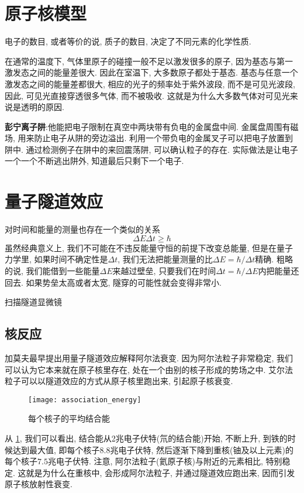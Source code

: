 \documentclass[openany]{book}
\begin{document}
\section{原子核模型}
电子的数目, 或者等价的说, 质子的数目, 决定了不同元素的化学性质.\par
在通常的温度下, 气体里原子的碰撞一般不足以激发很多的原子, 因为基态与第一激发态之间的能量差很大. 因此在室温下, 大多数原子都处于基态. 基态与任意一个激发态之间的能量差都很大, 相应的光子的频率处于紫外波段, 而不是可见光波段, 因此, 可见光直接穿透很多气体, 而不被吸收. 这就是为什么大多数气体对可见光来说是透明的原因.\par
\textbf{彭宁离子阱}:他能把电子限制在真空中两块带有负电的金属盘中间. 金属盘周围有磁场, 用来防止电子从阱的旁边溢出. 利用一个带负电的金属叉子可以把电子放置到阱中.
通过检测例子在阱中的来回震荡阱, 可以确认粒子的存在. 实际做法是让电子一个一个不断逃出阱外, 知道最后只剩下一个电子.

\section{量子隧道效应}
对时间和能量的测量也存在一个类似的关系
$$
\Delta E \Delta t \geq \hbar
$$
虽然经典意义上, 我们不可能在不违反能量守恒的前提下改变总能量, 但是在量子力学里, 如果时间不确定性是$\Delta t$, 我们无法把能量测量的比$\Delta E = \hbar /\Delta t$精确.
粗略的说, 我们能借到一些能量$\Delta E$来越过壁垒, 只要我们在时间$\Delta t = \hbar / \Delta E$内把能量还回去. 如果势垒太高或者太宽, 隧穿的可能性就会变得非常小.

扫描隧道显微镜

\subsection{核反应}
加莫夫最早提出用量子隧道效应解释阿尔法衰变. 因为阿尔法粒子非常稳定, 我们可以认为它本来就在原子核里存在, 处在一个由别的核子形成的势场之中. 
艾尔法粒子可以以隧道效应的方式从原子核里跑出来, 引起原子核衰变.

\begin{figure}[htbp]
		\centering
		\texttt{[image: association\_energy]}
		\caption{每个核子的平均结合能}
		\label{fig.nuclear.association}
\end{figure}
从
\ref{fig.nuclear.association},
我们可以看出, 结合能从2兆电子伏特(氘的结合能)开始, 不断上升, 到铁的时候达到最大值, 即每个核子$8.8$兆电子伏特, 
然后逐渐下降到重核(铀及以上元素)的每个核子$7.5$兆电子伏特.
注意, 阿尔法粒子(氦原子核)与附近的元素相比, 特别稳定. 这就是为什么在重核中, 会形成阿尔法粒子, 并通过隧道效应跑出来, 因而引发原子核放射性衰变.
\end{document}
